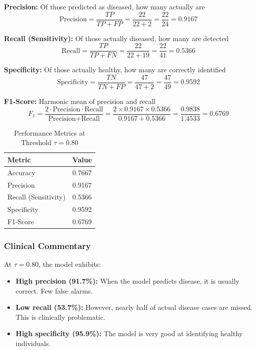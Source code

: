 \documentclass[11pt]{article}
\begin{document}
\textbf{Precision:} Of those predicted as diseased, how many actually are
\begin{equation}
    \text{Precision} = \frac{TP}{TP + FP} = \frac{22}{22 + 2} = \frac{22}{24} = 0.9167
\end{equation}

\textbf{Recall (Sensitivity):} Of those actually diseased, how many are detected
\begin{equation}
    \text{Recall} = \frac{TP}{TP + FN} = \frac{22}{22 + 19} = \frac{22}{41} = 0.5366
\end{equation}

\textbf{Specificity:} Of those actually healthy, how many are correctly identified
\begin{equation}
    \text{Specificity} = \frac{TN}{TN + FP} = \frac{47}{47 + 2} = \frac{47}{49} = 0.9592
\end{equation}

\textbf{F1-Score:} Harmonic mean of precision and recall
\begin{equation}
    F_1 = \frac{2 \cdot \text{Precision} \cdot \text{Recall}}{\text{Precision} + \text{Recall}} = \frac{2 \times 0.9167 \times 0.5366}{0.9167 + 0.5366} = \frac{0.9838}{1.4533} = 0.6769
\end{equation}

\begin{table}[H]
    \centering
    \caption{Performance Metrics at Threshold $\tau = 0.80$}
    \begin{tabular}{lc}
        \toprule
        \textbf{Metric} & \textbf{Value} \\
        \midrule
        Accuracy & 0.7667 \\
        Precision & 0.9167 \\
        Recall (Sensitivity) & 0.5366 \\
        Specificity & 0.9592 \\
        F1-Score & 0.6769 \\
        \bottomrule
    \end{tabular}
    \label{tab:metrics_0_80}
\end{table}

\subsubsection{Clinical Commentary}

At $\tau = 0.80$, the model exhibits:
\begin{itemize}
    \item \textbf{High precision (91.7\%):} When the model predicts disease, it is usually correct. Few false alarms.
    \item \textbf{Low recall (53.7\%):} However, nearly half of actual disease cases are missed. This is clinically problematic.
    \item \textbf{High specificity (95.9\%):} The model is very good at identifying healthy individuals.
\end{itemize}
\end{document}
